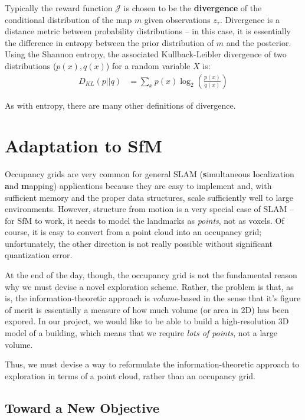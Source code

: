 \documentclass[12pt]{article}
\begin{document}
Typically the reward function $\mathcal{J}$ is chosen to be the \textbf{divergence} of the conditional distribution of the map $m$ given observations $z_{\tau}$. Divergence is a distance metric between probability distributions -- in this case, it is essentially the difference in entropy between the prior distribution of $m$ and the posterior. Using the Shannon entropy, the associated Kullback-Leibler divergence of two distributions ($p(x), q(x)$) for a random variable $X$ is:
\begin{align}
  D_{KL}(p || q) &= \sum_x p(x) \log_2 \left(\frac{p(x)}{q(x)}\right)
\end{align}

As with entropy, there are many other definitions of divergence.

\section{Adaptation to SfM}

Occupancy grids are very common for general SLAM (\textbf{s}imultaneous \textbf{l}ocalization \textbf{a}nd \textbf{m}apping) applications because they are easy to implement and, with sufficient memory and the proper data structures, scale sufficiently well to large environments. However, structure from motion is a very special case of SLAM -- for SfM to work, it needs to model the landmarks as \textit{points}, not as voxels. Of course, it is easy to convert from a point cloud into an occupancy grid; unfortunately, the other direction is not really possible without significant quantization error.

At the end of the day, though, the occupancy grid is not the fundamental reason why we must devise a novel exploration scheme. Rather, the problem is that, as is, the information-theoretic approach is \textit{volume}-based in the sense that it's figure of merit is essentially a measure of how much volume (or area in 2D) has been expored. In our project, we would like to be able to build a high-resolution 3D model of a building, which means that we require \textit{lots of points}, not a large volume.

Thus, we must devise a way to reformulate the information-theoretic approach to exploration in terms of a point cloud, rather than an occupancy grid.

\subsection{Toward a New Objective}
\end{document}
